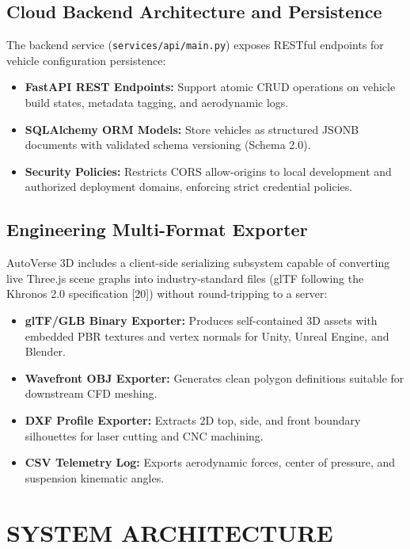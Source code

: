 \documentclass[12pt,a4paper]{report}
\begin{document}
\section{Cloud Backend Architecture and Persistence}
The backend service (\texttt{services/api/main.py}) exposes RESTful endpoints for vehicle configuration persistence:
\begin{itemize}
    \item \textbf{FastAPI REST Endpoints:} Support atomic CRUD operations on vehicle build states, metadata tagging, and aerodynamic logs.
    \item \textbf{SQLAlchemy ORM Models:} Store vehicles as structured JSONB documents with validated schema versioning (Schema 2.0).
    \item \textbf{Security Policies:} Restricts CORS allow-origins to local development and authorized deployment domains, enforcing strict credential policies.
\end{itemize}

\section{Engineering Multi-Format Exporter}
AutoVerse 3D includes a client-side serializing subsystem capable of converting live Three.js scene graphs into industry-standard files (glTF following the Khronos 2.0 specification [20]) without round-tripping to a server:
\begin{itemize}
    \item \textbf{glTF/GLB Binary Exporter:} Produces self-contained 3D assets with embedded PBR textures and vertex normals for Unity, Unreal Engine, and Blender.
    \item \textbf{Wavefront OBJ Exporter:} Generates clean polygon definitions suitable for downstream CFD meshing.
    \item \textbf{DXF Profile Exporter:} Extracts 2D top, side, and front boundary silhouettes for laser cutting and CNC machining.
    \item \textbf{CSV Telemetry Log:} Exports aerodynamic forces, center of pressure, and suspension kinematic angles.
\end{itemize}

\chapter{SYSTEM ARCHITECTURE}
\end{document}
